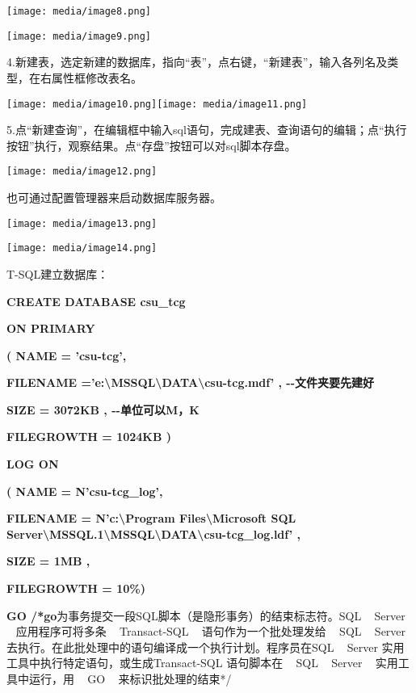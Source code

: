 \documentclass[
]{article}
\begin{document}
\texttt{[image: media/image8.png]}

\texttt{[image: media/image9.png]}

4.新建表，选定新建的数据库，指向``表''，点右键，``新建表''，输入各列名及类型，在右属性框修改表名。

\texttt{[image: media/image10.png]}\texttt{[image: media/image11.png]}

5.点``新建查询''，在编辑框中输入sql语句，完成建表、查询语句的编辑；点``执行按钮''执行，观察结果。点``存盘''按钮可以对sql脚本存盘。

\texttt{[image: media/image12.png]}

也可通过配置管理器来启动数据库服务器。

\texttt{[image: media/image13.png]}

\texttt{[image: media/image14.png]}

T-SQL建立数据库：

\textbf{CREATE DATABASE csu\_tcg}

\textbf{ON PRIMARY}

\textbf{( NAME = 'csu-tcg',}

\textbf{FILENAME
='e:\textbackslash MSSQL\textbackslash DATA\textbackslash csu-tcg.mdf' ,
-\/-文件夹要先建好}

\textbf{SIZE = 3072KB , -\/-单位可以M，K}

\textbf{FILEGROWTH = 1024KB )}

\textbf{LOG ON}

\textbf{( NAME = N'csu-tcg\_log',}

\textbf{FILENAME = N'c:\textbackslash Program
Files\textbackslash Microsoft SQL
Server\textbackslash MSSQL.1\textbackslash MSSQL\textbackslash DATA\textbackslash csu-tcg\_log.ldf'
,}

\textbf{SIZE = 1MB ,}

\textbf{FILEGROWTH = 10\%)}

\textbf{GO /*go}为事务提交一段SQL脚本（是隐形事务）的结束标志符。SQL ~
Server ~ 应用程序可将多条 ~ Transact-SQL ~ 语句作为一个批处理发给 ~ SQL
~ Server去执行。在此批处理中的语句编译成一个执行计划。程序员在SQL ~
Server 实用工具中执行特定语句，或生成Transact-SQL 语句脚本在 ~ SQL ~
Server ~ 实用工具中运行，用 ~ GO ~ 来标识批处理的结束*/
\end{document}
